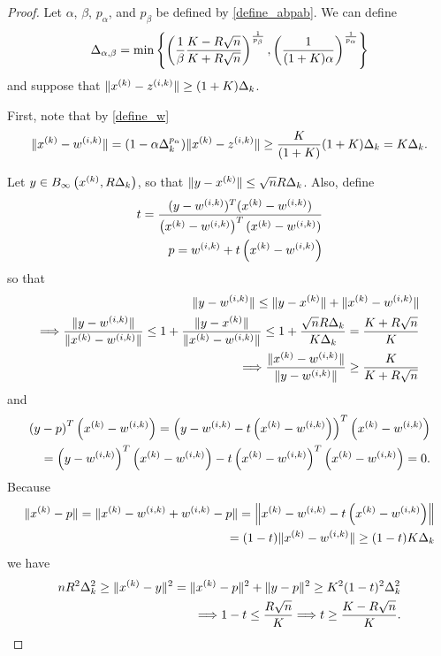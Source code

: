 \begin{proof}
Let $\alpha$, $\beta$, $p_{\alpha}$, and $p_{\beta}$ be defined by \cref{define_abpab}.
We can define
\begin{align}
{\Delta_{\alpha,\beta}} = \min\left\{
\left(\frac 1 {\beta }\frac {K - R\sqrt{n}}{K + R\sqrt{n}}\right)^{\frac 1 {p_{\beta }}},
\left(\frac 1 {(1+K)\alpha}\right)^{\frac 1 {p_{\alpha}}}
\right\} \label{define_deltalargzik}
\end{align}
and suppose that $\|x^{(k)} - {z^{(i, k)}}\| \ge (1+K) \Delta_k$.

First, note that by \cref{define_w}
\begin{align*}
\|x^{(k)} - {w^{(i, k)}}\| = (1 - \alpha\Delta_k^{p_{\alpha}}) \|x^{(k)} - {z^{(i, k)}}\| \ge \frac {K} {(1+K)} (1+K)\Delta_k = K\Delta_k.
\end{align*}

Let $y \in B_{\infty}\left(x^{(k)}, R \Delta_k\right)$, so that $\|y - x^{(k)}\| \le \sqrt{n}R\Delta_k$.
Also, define
\begin{align*}
t  = \frac{(y - {w^{(i, k)}})^T(x^{(k)} - {w^{(i, k)}})}{\left(x^{(k)} - {w^{(i, k)}}\right)^T(x^{(k)} - {w^{(i, k)}})} \\
p = {w^{(i, k)}} + t\left(x^{(k)} - {w^{(i, k)}}\right)
\end{align*}
so that
\begin{align*}
\|y - {w^{(i, k)}}\| \le \|y - x^{(k)}\| + \|x^{(k)} - {w^{(i, k)}}\| \\
\Longrightarrow \frac{\|y - {w^{(i, k)}}\|}{\|x^{(k)} - {w^{(i, k)}}\|} \le 1 +  \frac{\|y - x^{(k)}\|}{\|x^{(k)} - {w^{(i, k)}}\|} 
\le 1 + \frac{\sqrt{n}R\Delta_k}{K \Delta_k} = \frac {K+R\sqrt{n}}{K} \\
\Longrightarrow \frac{\|x^{(k)} - {w^{(i, k)}}\|}{\|y - {w^{(i, k)}}\|} \ge \frac {K}{K+R\sqrt{n}}
\end{align*}
and
\begin{align*}
\left(y - p\right)^T\left(x^{(k)} - {w^{(i, k)}}\right) = 
\left(y - {w^{(i, k)}} - t\left(x^{(k)} - {w^{(i, k)}}\right)\right)^T\left(x^{(k)} - {w^{(i, k)}}\right) \\
= \left(y - {w^{(i, k)}}\right)^T\left(x^{(k)} - {w^{(i, k)}}\right) - t\left(x^{(k)} - {w^{(i, k)}}\right)^T\left(x^{(k)} - {w^{(i, k)}}\right) = 0.
\end{align*}
Because
\begin{align*}
\|x^{(k)} - p\| = \|x^{(k)} - {w^{(i, k)}} + {w^{(i, k)}} - p\| = \left\|x^{(k)} - {w^{(i, k)}} - t\left(x^{(k)} - {w^{(i, k)}}\right)\right\| \\
= (1-t)\|x^{(k)} - {w^{(i, k)}}\| \ge (1-t)K\Delta_k
\end{align*}
we have
\begin{align*}
nR^2\Delta_k^2 \ge \|x^{(k)} - y\|^2 = \|x^{(k)} - p\|^2 + \|y - p\|^2 \ge K^2(1-t)^2\Delta_k^2  \\
\Longrightarrow 1-t \le \frac {R\sqrt{n}} {K} 
\Longrightarrow t \ge \frac {K - R\sqrt{n}}{K}.
\end{align*}


\end{proof}
